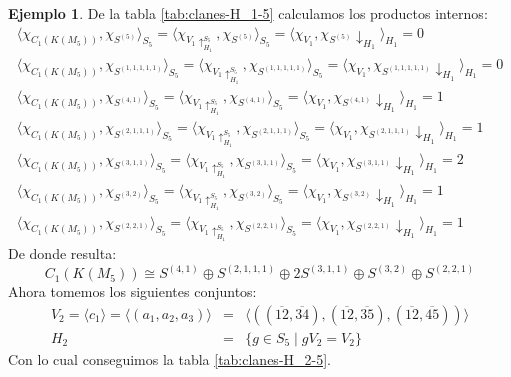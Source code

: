 \documentclass[12pt]{book}
\theoremstyle{definition}
\newtheorem{example}[theorem]{Ejemplo}
\newcounter{in}
\begin{document}
\begin{example}
De la tabla \ref{tab:clanes-H_1-5} calculamos los productos internos:
\begin{eqnarray*}
  \langle\chi_{C_{1}(K(M_{5}))},\chi_{S^{(5)}}\rangle_{S_{5}}=\langle\chi_{V_{1}\uparrow^{S_{5}}_{H_1}},\chi_{S^{(5)}}\rangle_{S_{5}}=\langle\chi_{V_{1}},\chi_{S^{(5)}}\downarrow_{H_{1}}\rangle_{H_{1}}=0\\
  \langle\chi_{C_{1}(K(M_{5}))},\chi_{S^{(1,1,1,1,1)}}\rangle_{S_{5}}=\langle\chi_{V_{1}\uparrow^{S_{5}}_{H_1}},\chi_{S^{(1,1,1,1,1)}}\rangle_{S_{5}}=\langle\chi_{V_{1}},\chi_{S^{(1,1,1,1,1)}}\downarrow_{H_{1}}\rangle_{H_{1}}=0\\
  \langle\chi_{C_{1}(K(M_{5}))},\chi_{S^{(4,1)}}\rangle_{S_{5}}=\langle\chi_{V_{1}\uparrow^{S_{5}}_{H_1}},\chi_{S^{(4,1)}}\rangle_{S_{5}}=\langle\chi_{V_{1}},\chi_{S^{(4,1)}}\downarrow_{H_{1}}\rangle_{H_{1}}=1\\
  \langle\chi_{C_{1}(K(M_{5}))},\chi_{S^{(2,1,1,1)}}\rangle_{S_{5}}=\langle\chi_{V_{1}\uparrow^{S_{5}}_{H_1}},\chi_{S^{(2,1,1,1)}}\rangle_{S_{5}}=\langle\chi_{V_{1}},\chi_{S^{(2,1,1,1)}}\downarrow_{H_{1}}\rangle_{H_{1}}=1\\
  \langle\chi_{C_{1}(K(M_{5}))},\chi_{S^{(3,1,1)}}\rangle_{S_{5}}=\langle\chi_{V_{1}\uparrow^{S_{5}}_{H_1}},\chi_{S^{(3,1,1)}}\rangle_{S_{5}}=\langle\chi_{V_{1}},\chi_{S^{(3,1,1)}}\downarrow_{H_{1}}\rangle_{H_{1}}=2\\
  \langle\chi_{C_{1}(K(M_{5}))},\chi_{S^{(3,2)}}\rangle_{S_{5}}=\langle\chi_{V_{1}\uparrow^{S_{5}}_{H_1}},\chi_{S^{(3,2)}}\rangle_{S_{5}}=\langle\chi_{V_{1}},\chi_{S^{(3,2)}}\downarrow_{H_{1}}\rangle_{H_{1}}=1\\
  \langle\chi_{C_{1}(K(M_{5}))},\chi_{S^{(2,2,1)}}\rangle_{S_{5}}=\langle\chi_{V_{1}\uparrow^{S_{5}}_{H_1}},\chi_{S^{(2,2,1)}}\rangle_{S_{5}}=\langle\chi_{V_{1}},\chi_{S^{(2,2,1)}}\downarrow_{H_{1}}\rangle_{H_{1}}=1
\end{eqnarray*}
De donde resulta:
\begin{equation}
C_{1}(K(M_{5}))\cong S^{(4,1)}\oplus S^{(2,1,1,1)}\oplus
2S^{(3,1,1)}\oplus S^{(3,2)} \oplus S^{(2,2,1)}
\label{C1-KM5}
\end{equation}
Ahora tomemos los siguientes conjuntos:
\begin{eqnarray*}
V_{2}=\langle c_{1}\rangle=\langle
(a_{1},a_{2},a_{3})\rangle&=&\langle((\overline{12},\overline{34}),(\overline{12},\overline{35}),(\overline{12},\overline{45}))\rangle\\
H_{2}&=&\{g\in S_{5}\mid gV_{2}=V_{2}\}
\end{eqnarray*}
Con lo cual conseguimos la tabla \ref{tab:clanes-H_2-5}.

\end{example}
\end{document}
